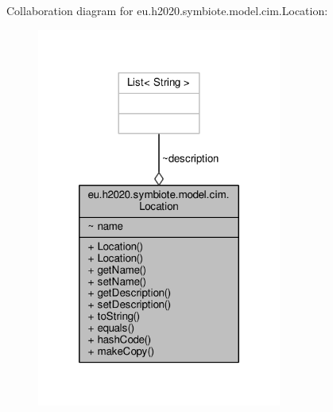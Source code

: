 Collaboration diagram for eu.\+h2020.\+symbiote.\+model.\+cim.\+Location\+:\nopagebreak
\begin{figure}[H]
\begin{center}
\leavevmode
\includegraphics[width=228pt]{classeu_1_1h2020_1_1symbiote_1_1model_1_1cim_1_1Location__coll__graph}
\end{center}
\end{figure}
